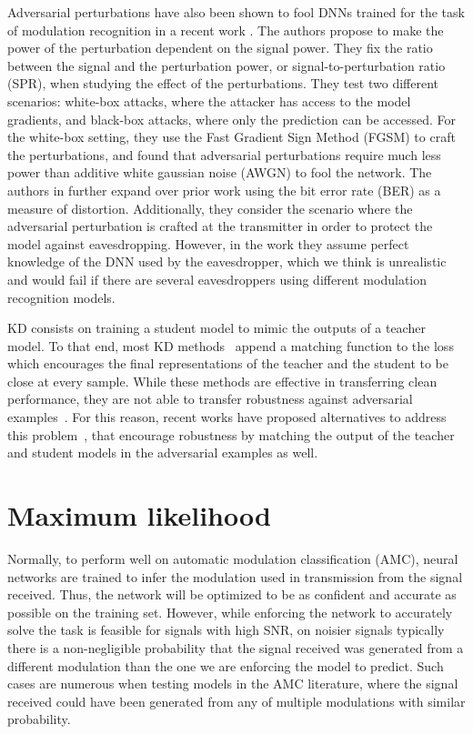 \documentclass[conference]{IEEEtran}
\begin{document}
Adversarial perturbations have also been shown to fool DNNs trained for the task of modulation recognition in a recent work \cite{Sadeghi_Larsson_2019}. The authors propose to make the power of the perturbation dependent on the signal power. They fix the ratio between the signal and the perturbation power, or signal-to-perturbation ratio (SPR), when studying the effect of the perturbations. They test two different scenarios: white-box attacks, where the attacker has access to the model gradients, and black-box attacks, where only the prediction can be accessed. For the white-box setting, they use the Fast Gradient Sign Method (FGSM) \cite{Goodfellow_Shlens_Szegedy_2015} to craft the perturbations, and found that adversarial perturbations require much less power than additive white gaussian noise (AWGN) to fool the network. The authors in \cite{Flowers_Buehrer_Headley_2019} further expand over prior work \cite{Sadeghi_Larsson_2019} using the bit error rate (BER) as a measure of distortion. Additionally, they consider the scenario where the adversarial perturbation is crafted at the transmitter in order to protect the model against eavesdropping. However, in the work they assume perfect knowledge of the DNN used by the eavesdropper, which we think is unrealistic and would fail if there are several eavesdroppers using different modulation recognition models.

KD consists on training a student model to mimic the outputs of a teacher model. To that end, most KD methods~\cite{hinton2015distilling,romero2014fitnets,zagoruyko2016paying,chebotar2016distilling} append a matching function to the loss which encourages the final representations of the teacher and the student to be close at every sample.
While these methods are effective in transferring clean performance, they are not able to transfer robustness against adversarial examples~\cite{goldblum2020adversarially}. For this reason, recent works have proposed alternatives to address this problem~\cite{goldblum2020adversarially,zi2021revisiting,zhu2021reliable,shao2021and,maroto2022benefits}, that encourage robustness by matching the output of the teacher and student models in the adversarial examples as well.

\section{Maximum likelihood}

Normally, to perform well on automatic modulation classification (AMC), neural networks are trained to infer the modulation used in transmission from the signal received. Thus, the network will be optimized to be as confident and accurate as possible on the training set. However, while enforcing the network to accurately solve the task is feasible for signals with high SNR, on noisier signals typically there is a non-negligible probability that the signal received was generated from a different modulation than the one we are enforcing the model to predict. Such cases are numerous when testing models in the AMC literature, where the signal received could have been generated from any of multiple modulations with similar probability.
\end{document}
